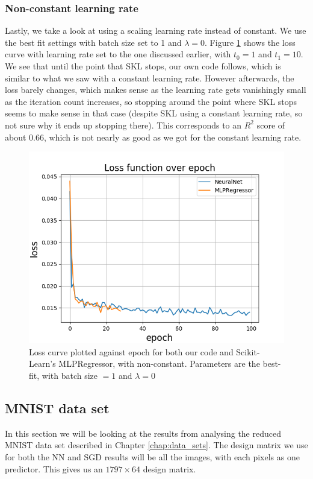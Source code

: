 \documentclass[a4paper]{article}
\begin{document}
\subsubsection*{Non-constant learning rate}
Lastly, we take a look at using a scaling learning rate instead of constant. We use the best fit settings with batch size set to 1 and $\lambda = 0$. Figure \ref{fig:nn_franke_skl_lr} shows the loss curve with learning rate set to the one discussed earlier, with $t_0 = 1$ and $t_1 = 10$. We see that until the point that SKL stops, our own code follows, which is similar to what we saw with a constant learning rate. However afterwards, the loss barely changes, which makes sense as the learning rate gets vanishingly small as the iteration count increases, so stopping around the point where SKL stops seems to make sense in that case (despite SKL using a constant learning rate, so not sure why it ends up stopping there). This corresponds to an $R^2$ score of about $0.66$, which is not nearly as good as we got for the constant learning rate.
\begin{figure}[H]
  \centering
  \includegraphics[scale=0.45]{../figures/task_b/minibatch1_optimal/loss.png}
  \caption{Loss curve plotted against epoch for both our code and Scikit-Learn's MLPRegressor, with non-constant. Parameters are the best-fit, with batch size $=1$ and $\lambda = 0$}
  \label{fig:nn_franke_skl_lr}
\end{figure}

\subsection{MNIST data set}
In this section we will be looking at the results from analysing the reduced MNIST data set described in Chapter \ref{chap:data_sets}. The design matrix we use for both the NN and SGD results will be all the images, with each pixels as one predictor. This gives us an $1797\times64$ design matrix.
\end{document}
